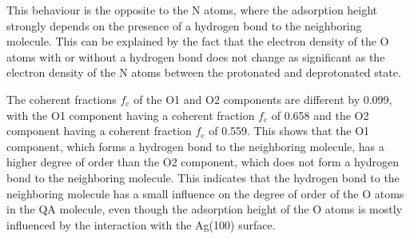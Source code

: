 This behaviour is the opposite to the N atoms, where the adsorption height strongly depends on the presence of a hydrogen bond to the neighboring molecule. This can be explained by the fact that the electron density of the O atoms with or without a hydrogen bond does not change as significant as the electron density of the N atoms between the protonated and deprotonated state.

The coherent fractions $f_\mathrm{c}$ of the O1 and O2 components are different by 0.099, with the O1 component having a coherent fraction $f_\mathrm{c}$ of 0.658 and the O2 component having a coherent fraction $f_\mathrm{c}$ of 0.559. This shows that the O1 component, which forms a hydrogen bond to the neighboring molecule, has a higher degree of order than the O2 component, which does not form a hydrogen bond to the neighboring molecule. This indicates that the hydrogen bond to the neighboring molecule has a small influence on the degree of order of the O atoms in the \ac{QA} molecule, even though the adsorption height of the O atoms is mostly influenced by the interaction with the Ag(100) surface.



\cleardoublepage